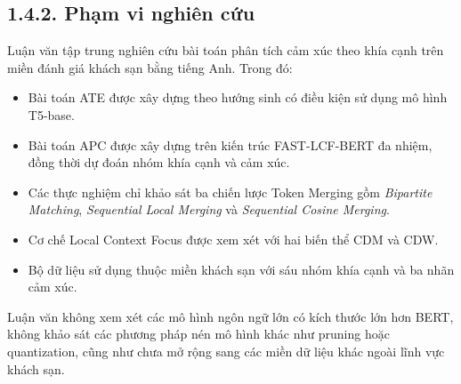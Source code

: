 \subsection{1.4.2. Phạm vi nghiên cứu}

Luận văn tập trung nghiên cứu bài toán phân tích cảm xúc theo khía cạnh trên miền đánh giá khách sạn bằng tiếng Anh. Trong đó:

\begin{itemize}
    \item Bài toán ATE được xây dựng theo hướng sinh có điều kiện sử dụng mô hình T5-base.
    
    \item Bài toán APC được xây dựng trên kiến trúc FAST-LCF-BERT đa nhiệm, đồng thời dự đoán nhóm khía cạnh và cảm xúc.
    
    \item Các thực nghiệm chỉ khảo sát ba chiến lược Token Merging gồm \textit{Bipartite Matching}, \textit{Sequential Local Merging} và \textit{Sequential Cosine Merging}.
    
    \item Cơ chế Local Context Focus được xem xét với hai biến thể CDM và CDW.
    
    \item Bộ dữ liệu sử dụng thuộc miền khách sạn với sáu nhóm khía cạnh và ba nhãn cảm xúc.
\end{itemize}

Luận văn không xem xét các mô hình ngôn ngữ lớn có kích thước lớn hơn BERT, không khảo sát các phương pháp nén mô hình khác như pruning hoặc quantization, cũng như chưa mở rộng sang các miền dữ liệu khác ngoài lĩnh vực khách sạn.
 